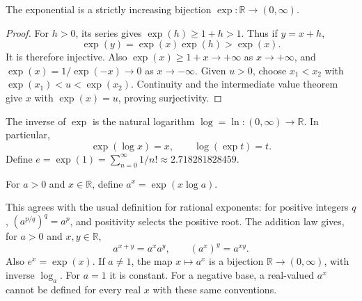 \begin{theorem}
The exponential is a strictly increasing bijection
$\exp:\mathbb R\to(0,\infty)$.
\end{theorem}
\begin{proof}
For $h>0$, its series gives $\exp(h)\geq1+h>1$. Thus if $y=x+h$,
\[
\exp(y)=\exp(x)\exp(h)>\exp(x).
\]
It is therefore injective. Also $\exp(x)\geq1+x\to+\infty$ as
$x\to+\infty$, and $\exp(x)=1/\exp(-x)\to0$ as $x\to-\infty$.
Given $u>0$, choose $x_1<x_2$ with $\exp(x_1)<u<\exp(x_2)$.
Continuity and the intermediate value theorem give $x$ with $\exp(x)=u$,
proving surjectivity.
\end{proof}

\begin{definition}
The inverse of $\exp$ is the natural logarithm
$\log=\ln:(0,\infty)\to\mathbb R$. In particular,
\[
\exp(\log x)=x,\qquad \log(\exp t)=t.
\]
Define $e=\exp(1)=\sum_{n=0}^{\infty}1/n!\approx2.718281828459$.
\end{definition}

\begin{definition}
For $a>0$ and $x\in\mathbb R$, define $a^x=\exp(x\log a)$.
\end{definition}
This agrees with the usual definition for rational exponents: for positive
integers $q$, $(a^{p/q})^q=a^p$, and positivity selects the positive root.
The addition law gives, for $a>0$ and $x,y\in\mathbb R$,
\[
a^{x+y}=a^xa^y,\qquad (a^x)^y=a^{xy}.
\]
Also $e^x=\exp(x)$. If $a\ne1$, the map $x\mapsto a^x$ is a bijection
$\mathbb R\to(0,\infty)$, with inverse $\log_a$. For $a=1$ it is constant.
For a negative base, a real-valued $a^x$ cannot be defined for every real
$x$ with these same conventions.
